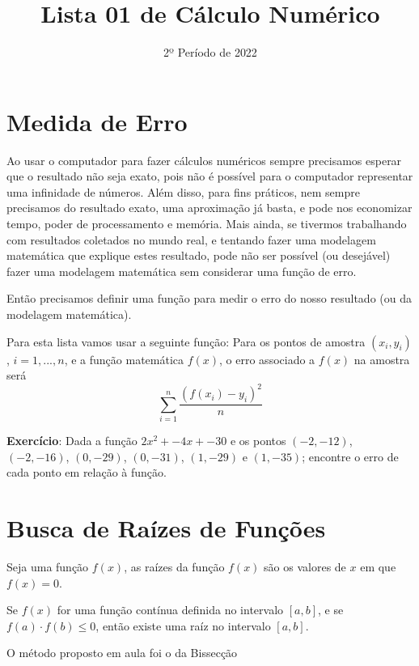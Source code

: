 \documentclass[12pt]{article}
\title{Lista 01 de Cálculo Numérico}
\date{2º Período de 2022}
\def\le{\leqslant}\def\leq{\le}
\begin{document}
\maketitle


\vspace{3em}

\section{Medida de Erro}

Ao usar o computador para fazer cálculos numéricos sempre precisamos esperar que o resultado não seja exato, pois não é possível para o computador representar uma infinidade de números. Além disso, para fins práticos, nem sempre precisamos do resultado exato, uma aproximação já basta, e pode nos economizar tempo, poder de processamento e memória. Mais ainda, se tivermos trabalhando com resultados coletados no mundo real, e tentando fazer uma modelagem matemática que explique estes resultado, pode não ser possível (ou desejável) fazer uma modelagem matemática sem considerar uma função de erro.

Então precisamos definir uma função para medir o erro do nosso resultado (ou da modelagem matemática).

Para esta lista vamos usar a seguinte função: 
Para os pontos de amostra $(x_i, y_i)$, $i = 1, ..., n$, e a função matemática $f(x)$, o erro associado a $f(x)$ na amostra será
\[\sum_{i=1}^{n}\frac{(f(x_i) - y_i)^2}{n}\]

\textbf{Exercício}: Dada a função $2x^2 + -4x + -30$ e os pontos $(-2, -12)$, $(-2, -16)$, $(0, -29)$, $(0, -31)$, $(1, -29)$ e $(1, -35)$; encontre o erro de cada ponto em relação à função.



\break



\section{Busca de Raízes de Funções}

Seja uma função $f(x)$, as raízes da função $f(x)$ são os valores de $x$ em que $f(x)=0$.

Se $f(x)$ for uma função contínua definida no intervalo $[a, b]$, e se $f(a)\cdot f(b) \le 0$, então existe uma raíz no intervalo $[a, b]$.

O método proposto em aula foi o da Bissecção


\end{document}
